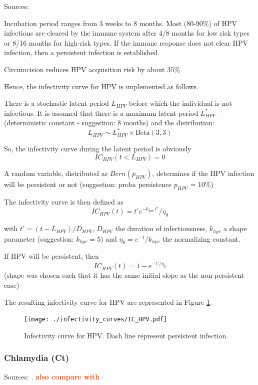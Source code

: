 \documentclass[11pt, onecolumn]{article}
\newcommand{\warning}[1]{\textbf{\textcolor{OrangeRed}{#1}}}
\begin{document}
Sources: \cite{Stanley:2011dd} \cite{Baussano:2013dh}


Incubation period ranges from 3 weeks to 8 months. Most (80-90\%) of HPV infections are cleared by the immune system after 4/8 months for low risk types or 8/16 months for high-risk types. If the immune response does not clear HPV infection, then a persistent infection is established.

Circumcision reduces HPV acquisition risk by about 35\% \cite{Tobian:2009kp}

Hence, the infectivity curve for HPV is implemented as follows. 

There is a stochastic latent period $L_{HPV}$ before which the individual is not infectious. It is assumed that there is a maximum latent period $L_{HPV}^*$ (deterministic constant - suggestion: 8 months) and the distribution:
$$L_{HPV} \sim L_{HPV}^* \times \mathrm{Beta}(3,3) $$

So, the infectivity curve during the latent period is obviously
$$IC_{HPV}(t< L_{HPV}) = 0$$

A random variable, distributed as $Bern(p_{HPV})$, determines if the HPV infection will be persistent or not (suggestion: proba persistence $p_{HPV}$ = 10\%)

The infectivity curve is then defined as
$$IC_{HPV}(t) = t' e^{-k_{hpv}\, t' }/ \eta_0$$

with $t' = (t-L_{HPV})/D_{HPV} $, $D_{HPV}$ the duration of infectiousness, $k_{hpv}$  a shape parameter (suggestion: $k_{hpv}=5$) and $\eta_0=e^{-1}/k_{hpv}$ the normalizing constant.

If HPV will be persistent, then 
$$IC_{HPV}(t) = 1- e^{-t'/\eta_0 }$$
(shape was chosen such that it has the same initial slope as the non-persistent case)

The resulting infectivity curve for HPV are represented in Figure \ref{fig:ICHPV}.
\begin{figure}[!ht]
\centering
    \texttt{[image: ./infectivity\_curves/IC\_HPV.pdf]}
\caption{Infectivity curve for HPV. Dash line represent persistent infection.}
\label{fig:ICHPV}
\end{figure}



\subsubsection{Chlamydia (Ct)}

Sources: \cite{Geisler:2010bc, Althaus:2011dc}. \warning{also compare with \cite{Hontelez:2013bc} \cite{Althaus:2012gg}}
\end{document}

